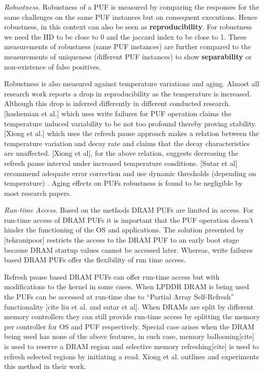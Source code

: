 \documentclass[journal, a4paper]{IEEEtran}
\begin{document}
\textit{Robustness.} Robustness of a PUF is measured by comparing the responses for the same challenges on the same PUF instances but on consequent executions. Hence robustness, in this context can also be seen as \textbf{reproducibility}. For robustness we need the HD to be close to 0 and the jaccard index to be close to 1. These measurements of robustness (same PUF instances) are further compared to the measurements of uniqueness (different PUF instances) to show \textbf{separability} or non-existence of false positives.

Robustness is also measured against temperature variations and aging. Almost all research work reports a drop in reproducibility as the temperature is increased. Although this drop is inferred differently in different conducted research. [hashemian et al.] which uses write failures for PUF operation claims the temperature induced variability to be not too profound thereby proving stability. [Xiong et al.] which uses the refresh pause approach makes a relation between the temperature variation and decay rate and claims that the decay characteristics are unaffected. [Xiong et al], for the above relation, suggests decreasing the refresh pause interval under increased temperature conditions. [Sutar et al] recommend adequate error correction and use dynamic thresholds (depending on temperature) . Aging effects on PUFs robustness is found to be negligible by most research papers.

\textit{Run-time Access.} Based on the methods DRAM PUFs are limited in access. For run-time access of DRAM PUFs it is important that the PUF operation doesn’t hinder the functioning of the OS and applications. The solution presented by [tehranipoor] restricts the access to the DRAM PUF to an early boot stage because DRAM startup values cannot be accessed later. Whereas, write failures based DRAM PUFs offer the flexibility of run time access.

Refresh pause based  DRAM PUFs can offer run-time access but with modifications to the kernel in some cases. When LPDDR DRAM is being used the PUFs can be accessed at run-time due to “Partial Array Self-Refresh” functionality [cite liu et al. and sutar et al]. When DRAMs are split by different memory controllers they can still provide run-time access by splitting the memory per controller for OS and PUF respectively. Special case arises when the DRAM being used has none of the above features, in such case, memory ballooning[cite] is used to reserve a DRAM region and selective memory refreshing[cite] is used to refresh selected regions by initiating a read. Xiong et al. outlines and experiments this method in their work.
\end{document}
